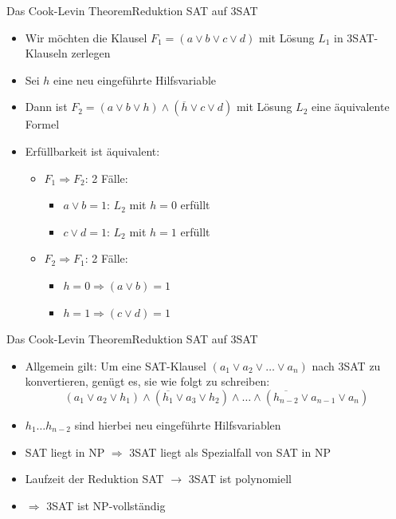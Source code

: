 \documentclass[ignorenonframetext,]{beamer}
\begin{document}
\begin{frame}{Das Cook-Levin Theorem}{Reduktion SAT auf 3SAT}

\begin{itemize}
\itemsep1pt\parskip0pt
\item
  Wir möchten die Klausel $F_1 = (a \vee b \vee c \vee d)$ mit Lösung
  $L_1$ in 3SAT-Klauseln zerlegen
\item
  Sei $h$ eine neu eingeführte Hilfsvariable
\item
  Dann ist $F_2 = (a \vee b \vee h) \wedge (\overline{h} \vee c \vee d)$
  mit Lösung $L_2$ eine äquivalente Formel
\item
  Erfüllbarkeit ist äquivalent:

  \begin{itemize}
  \itemsep1pt\parskip0pt
  \item
    $F_1 \Rightarrow F_2$: 2 Fälle:

    \begin{itemize}
    \itemsep1pt\parskip0pt
    \item
      $a \vee b = 1$: $L_2$ mit $h = 0$ erfüllt
    \item
      $c \vee d = 1$: $L_2$ mit $h = 1$ erfüllt
    \end{itemize}
  \item
    $F_2 \Rightarrow F_1$: 2 Fälle:

    \begin{itemize}
    \itemsep1pt\parskip0pt
    \item
      $h = 0 \Rightarrow (a \vee b) = 1$
    \item
      $h = 1 \Rightarrow (c \vee d) = 1$
    \end{itemize}
  \end{itemize}
\end{itemize}

\end{frame}

\begin{frame}{Das Cook-Levin Theorem}{Reduktion SAT auf 3SAT}

\begin{itemize}
\itemsep1pt\parskip0pt
\item
  Allgemein gilt: Um eine SAT-Klausel
  $(a_1 \vee a_2 \vee \dots \vee a_n)$ nach 3SAT zu konvertieren, genügt
  es, sie wie folgt zu schreiben:
  \[ (a_1 \vee a_2 \vee h_1) \wedge (\overline{h_1} \vee a_3 \vee h_2) \wedge \dots \wedge (\overline{h_{n-2}} \vee a_{n-1} \vee a_n) \]
\item
  $h_1 \dots h_{n-2}$ sind hierbei neu eingeführte Hilfsvariablen
\item
  SAT liegt in NP $\Rightarrow$ 3SAT liegt als Spezialfall von SAT in NP
\item
  Laufzeit der Reduktion SAT $\rightarrow$ 3SAT ist polynomiell 
\item
  $\Rightarrow$ 3SAT ist NP-vollständig
\end{itemize}

\end{frame}
\end{document}
